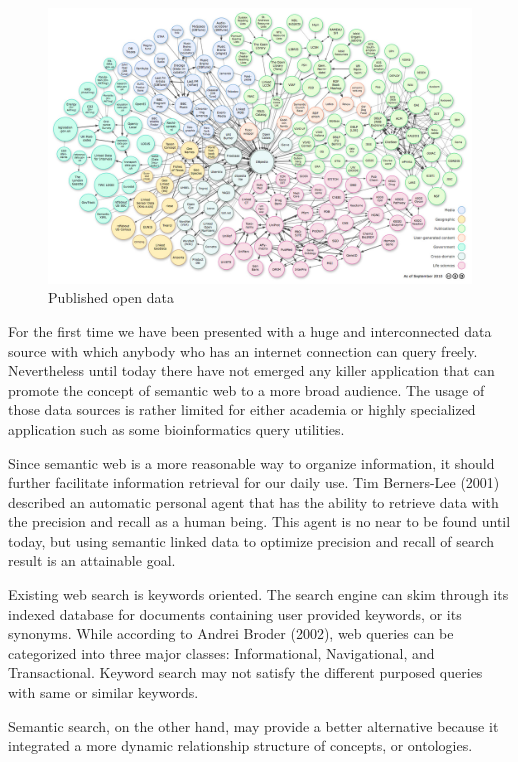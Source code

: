 \documentclass[12pt]{cls}
\begin{document}
\begin{figure}[H]
\centering
\includegraphics[width=\textwidth]{figures/opendata.jpeg}
\caption{Published open data}
\label{open data chart}
\end{figure}

For the first time we have been presented with a huge and interconnected data source with which anybody who has an internet connection can query freely. Nevertheless until today there have not emerged any killer application that can promote the concept of semantic web to a more broad audience. The usage of those data sources is rather limited for either academia or highly specialized application such as some bioinformatics query utilities.

Since semantic web is a more reasonable way to organize information, it should further facilitate information retrieval for our daily use. Tim Berners-Lee (2001) described an automatic personal agent that has the ability to retrieve data with the precision and recall as a human being. This agent is no near to be found until today, but using semantic linked data to optimize precision and recall of search result is an attainable goal.

Existing web search is keywords oriented. The search engine can skim through its indexed database for documents containing user provided keywords, or its synonyms. While according to Andrei Broder (2002), web queries can be categorized into three major classes: Informational, Navigational, and Transactional. Keyword search may not satisfy the different purposed queries with same or similar keywords.

Semantic search, on the other hand, may provide a better alternative because it integrated a more dynamic relationship structure of concepts, or ontologies.
\end{document}
